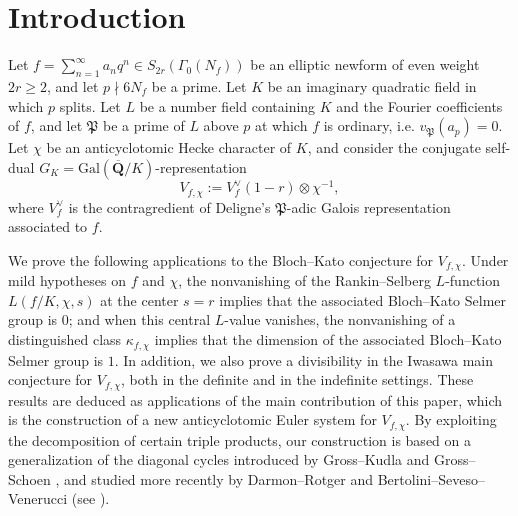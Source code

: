 \documentclass[10pt,letterpaper]{amsart}
\theoremstyle{plain}
\theoremstyle{definition}
\theoremstyle{definition}
\theoremstyle{plain}
\theoremstyle{plain}
\theoremstyle{plain}
\theoremstyle{remark}
\numberwithin{equation}{section}
\newcommand{\Q}{\mathbf{Q}}
\begin{document}
\maketitle
\setcounter{tocdepth}{2}
\newpage
\tableofcontents

\newpage
\section{Introduction}


{
\renewcommand{\thethm}{\Alph{thm}}


Let $f=\sum_{n=1}^\infty a_nq^n\in S_{2r}(\Gamma_0(N_f))$ be an elliptic newform of even weight $2r\geq 2$,  and let $p\nmid 6N_f$ be a prime. Let $K$ be an imaginary quadratic field in which $p$ splits. Let $L$ be a number field containing $K$ and the Fourier coefficients of $f$, and let $\mathfrak{P}$ be a prime of $L$ above $p$ at which $f$ is ordinary, i.e. $v_{\mathfrak{P}}(a_p)=0$. Let $\chi$ be an anticyclotomic Hecke character of $K$, and consider the conjugate self-dual $G_K={\mathrm{Gal}}(\overline{\Q}/K)$-representation
\[
V_{f,\chi}:=V_f^\vee(1-r)\otimes\chi^{-1},
\] 
where $V_f^\vee$ is the contragredient of Deligne's $\mathfrak{P}$-adic Galois representation associated to $f$. 

We prove the following applications to the Bloch--Kato conjecture for $V_{f,\chi}$. Under mild hypotheses on $f$ and $\chi$, the nonvanishing of the Rankin--Selberg $L$-function $L(f/K,\chi,s)$ at the center $s=r$ implies that the associated Bloch--Kato Selmer group is $0$; and when this central $L$-value vanishes, the nonvanishing of a distinguished class $\kappa_{f,\chi}$ implies that the dimension of the associated Bloch--Kato Selmer group is $1$. In addition, we also prove a divisibility in the Iwasawa main conjecture for $V_{f,\chi}$, both in the definite and in the indefinite settings. These results are deduced as applications of the main contribution of this paper, which is the  construction of a new anticyclotomic Euler system for $V_{f,\chi}$. By exploiting the decomposition of certain triple products, our construction is based on a generalization of the diagonal cycles introduced by Gross--Kudla \cite{gross-kudla} and Gross--Schoen \cite{gross-schoen}, and studied more recently by Darmon--Rotger and Bertolini--Seveso--Venerucci (see \cite{BDRSV}). 

}
\end{document}
